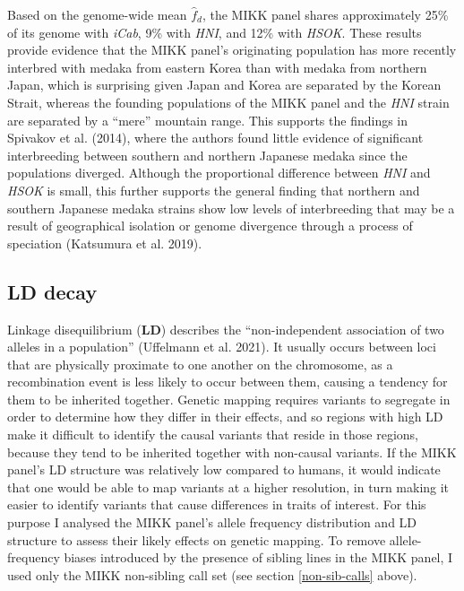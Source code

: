 \documentclass[
]{book}
\begin{document}
Based on the genome-wide mean \(\hat{f}_d\), the MIKK panel shares approximately 25\% of its genome with \emph{iCab}, 9\% with \emph{HNI}, and 12\% with \emph{HSOK}. These results provide evidence that the MIKK panel's originating population has more recently interbred with medaka from eastern Korea than with medaka from northern Japan, which is surprising given Japan and Korea are separated by the Korean Strait, whereas the founding populations of the MIKK panel and the \emph{HNI} strain are separated by a ``mere'' mountain range. This supports the findings in Spivakov et al. (2014), where the authors found little evidence of significant interbreeding between southern and northern Japanese medaka since the populations diverged. Although the proportional difference between \emph{HNI} and \emph{HSOK} is small, this further supports the general finding that northern and southern Japanese medaka strains show low levels of interbreeding that may be a result of geographical isolation or genome divergence through a process of speciation (Katsumura et al. 2019).

\hypertarget{ld-decay-sec}{%
\subsection{LD decay}\label{ld-decay-sec}}

Linkage disequilibrium (\textbf{LD}) describes the ``non-independent association of two alleles in a population'' (Uffelmann et al. 2021). It usually occurs between loci that are physically proximate to one another on the chromosome, as a recombination event is less likely to occur between them, causing a tendency for them to be inherited together. Genetic mapping requires variants to segregate in order to determine how they differ in their effects, and so regions with high LD make it difficult to identify the causal variants that reside in those regions, because they tend to be inherited together with non-causal variants. If the MIKK panel's LD structure was relatively low compared to humans, it would indicate that one would be able to map variants at a higher resolution, in turn making it easier to identify variants that cause differences in traits of interest. For this purpose I analysed the MIKK panel's allele frequency distribution and LD structure to assess their likely effects on genetic mapping. To remove allele-frequency biases introduced by the presence of sibling lines in the MIKK panel, I used only the MIKK non-sibling call set (see section \ref{non-sib-calls} above).
\end{document}
